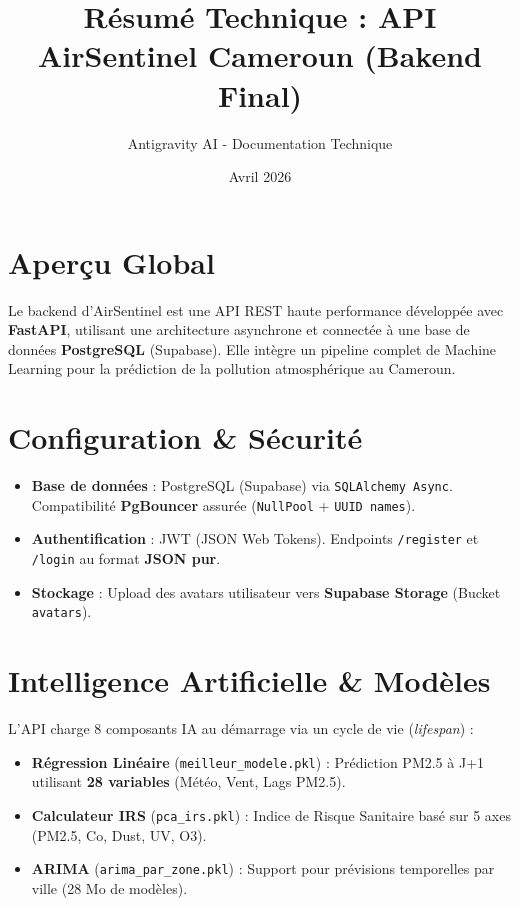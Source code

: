 \documentclass[11pt,a4paper]{article}
\title{Résumé Technique : API AirSentinel Cameroun (Bakend Final)}
\author{Antigravity AI - Documentation Technique}
\date{Avril 2026}
\begin{document}
\maketitle

\section{Aperçu Global}
Le backend d'AirSentinel est une API REST haute performance développée avec \textbf{FastAPI}, utilisant une architecture asynchrone et connectée à une base de données \textbf{PostgreSQL} (Supabase). Elle intègre un pipeline complet de Machine Learning pour la prédiction de la pollution atmosphérique au Cameroun.

\section{Configuration \& Sécurité}
\begin{itemize}
    \item \textbf{Base de données} : PostgreSQL (Supabase) via \texttt{SQLAlchemy Async}. Compatibilité \textbf{PgBouncer} assurée (\texttt{NullPool} + \texttt{UUID names}).
    \item \textbf{Authentification} : JWT (JSON Web Tokens). Endpoints \texttt{/register} et \texttt{/login} au format \textbf{JSON pur}.
    \item \textbf{Stockage} : Upload des avatars utilisateur vers \textbf{Supabase Storage} (Bucket \texttt{avatars}).
\end{itemize}

\section{Intelligence Artificielle \& Modèles}
L'API charge 8 composants IA au démarrage via un cycle de vie (\textit{lifespan}) :
\begin{itemize}
    \item \textbf{Régression Linéaire} (\texttt{meilleur\_modele.pkl}) : Prédiction PM2.5 à J+1 utilisant \textbf{28 variables} (Météo, Vent, Lags PM2.5).
    \item \textbf{Calculateur IRS} (\texttt{pca\_irs.pkl}) : Indice de Risque Sanitaire basé sur 5 axes (PM2.5, Co, Dust, UV, O3).
    \item \textbf{ARIMA} (\texttt{arima\_par\_zone.pkl}) : Support pour prévisions temporelles par ville (28 Mo de modèles).
\end{itemize}
\end{document}
